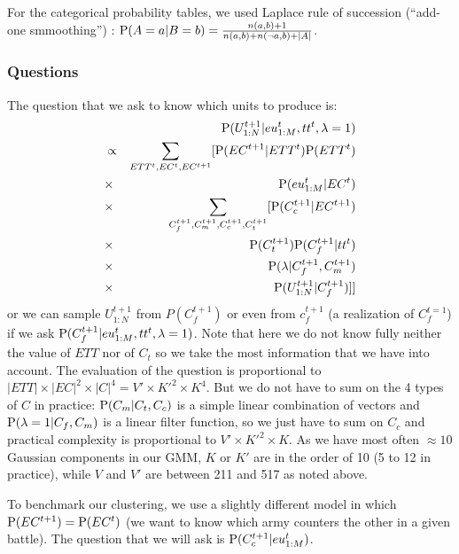 For the categorical probability tables, we used Laplace rule of succession (``add-one smmoothing'') \cite{Jaynes}: $\mathrm{P}(A=a|B=b)=\frac{n(a,b)+1}{n(a,b)+n(\neg a,b)+|A|}$.

\subsubsection{Questions}
The question that we ask to know which units to produce is:
\begin{eqnarray*}
 & & \mathrm{P}(U_{1:N}^{t+1} | eu_{1:M}^t, tt^t, \lambda = 1) \\
 & \propto & \sum_{ETT^t, EC^t, EC^{t+1}}[\mathrm{P}(EC^{t+1}|ETT^t)\mathrm{P}(ETT^t)\\
 & \times & \mathrm{P}(eu_{1:M}^t|EC^t) \\
 & \times & \sum_{C_f^{t+1},C_m^{t+1},C_c^{t+1},C_t^{t+1}}[\mathrm{P}(C_c^{t+1}|EC^{t+1})\\
 & \times & \mathrm{P}(C_{t}^{t+1})\mathrm{P}(C_{f}^{t+1}|tt^{t})\\
 & \times & \mathrm{P}(\lambda|C_{f}^{t+1},C_{m}^{t+1})\\
 & \times & \mathrm{P}(U_{1:N}^{t+1}|C_f^{t+1})]]
\end{eqnarray*}
or we can sample $U_{1:N}^{t+1}$ from $P(C_f^{t+1})$ or even from $c_f^{t+1}$ (a realization of $C_f^{t=1}$) if we ask $\mathrm{P}(C_f^{t+1} | eu_{1:M}^t, tt^t, \lambda = 1)$. Note that here we do not know fully neither the value of $ETT$ nor of $C_t$ so we take the most information that we have into account. The evaluation of the question is proportional to $|ETT|\times |EC|^2\times |C|^4 = V'\times K'^2 \times K^4$. But we do not have to sum on the 4 types of $C$ in practice: $\mathrm{P}(C_m|C_t,C_c)$ is a simple linear combination of vectors and $\mathrm{P}(\lambda=1|C_f,C_m)$ is a linear filter function, so we just have to sum on $C_c$ and practical complexity is proportional to $V'\times K'^2 \times K$. As we have most often $\approx 10$ Gaussian components in our GMM, $K$ or $K'$ are in the order of 10 (5 to 12 in practice), while $V$ and $V'$ are between 211 and 517 as noted above.

To benchmark our clustering, we use a slightly different model in which $\mathrm{P}(EC^{t+1})=\mathrm{P}(EC^t)$ (we want to know which army counters the other in a given battle). The question that we will ask is $\mathrm{P}(C_c^{t+1}|eu_{1:M}^t)$.

